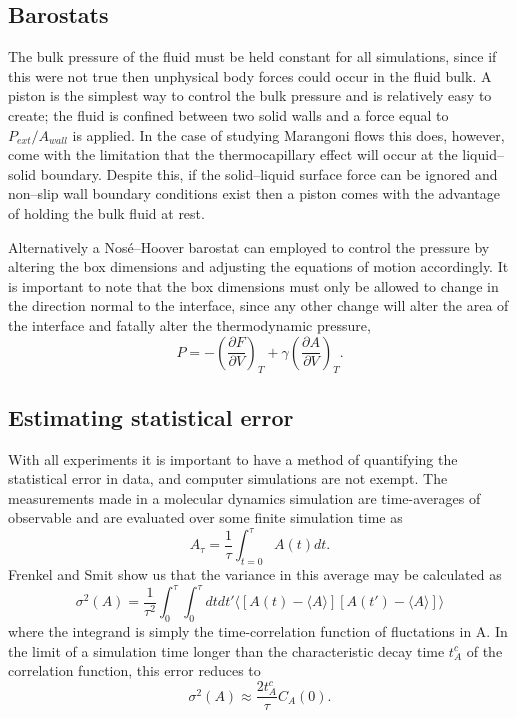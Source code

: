\subsection{Barostats}
The bulk pressure of the fluid must be held constant for all simulations, since if this were not true then unphysical body forces could occur in the fluid bulk.
A piston is the simplest way to control the bulk pressure and is relatively easy to create; the fluid is confined between two solid walls and a force equal to $P_{ext} / A_{wall}$ is applied.
In the case of studying Marangoni flows this does, however, come with the limitation that the thermocapillary effect will occur at the liquid--solid boundary.
Despite this, if the solid--liquid surface force can be ignored and non--slip wall boundary conditions exist then a piston comes with the advantage of holding the bulk fluid at rest.

Alternatively a Nos\'{e}--Hoover barostat can employed to control the pressure by altering the box dimensions and adjusting the equations of motion accordingly. \cite{NoseHoover1, NoseHoover2, NoseHoover3}
It is important to note that the box dimensions must only be allowed to change in the direction normal to the interface, since any other change will alter the area of the interface and fatally alter the thermodynamic pressure,
\begin{equation}
P = - \left( \frac{\partial F}{\partial V} \right)_{T} + \gamma \left( \frac{\partial A}{\partial V} \right)_{T}.
\end{equation}

\subsection{Estimating statistical error}
With all experiments it is important to have a method of quantifying the statistical error in data, and computer simulations are not exempt.
The measurements made in a molecular dynamics simulation are time-averages of observable and are evaluated over some finite simulation time as
$$A_{\tau} = \frac{1}{\tau} \int_{t=0}^{\tau} A(t) dt.$$
Frenkel and Smit show us that the variance in this average may be calculated as 
$$\sigma^{2}(A) = \frac{1}{\tau^{2}} \int_{0}^{\tau} \int_{0}^{\tau} dt dt' \big \langle [ A(t) - \langle A \rangle ] [A(t') - \langle A \rangle] \big \rangle$$
where the integrand is simply the time-correlation function of fluctations in A\cite{FrenkelSmit}.
In the limit of a simulation time longer than the characteristic decay time $t_{A}^c$ of the correlation function, this error reduces to 
$$\sigma^{2}(A) \approx \frac{2t^{c}_{A}}{\tau}C_{A}(0).$$

